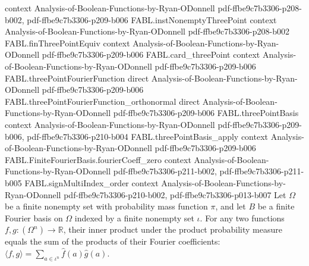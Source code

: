 \begin{theorem}
  {context}
  {Analysis-of-Boolean-Functions-by-Ryan-ODonnell}
  {pdf-ffbe9c7b3306-p208-b002,
    pdf-ffbe9c7b3306-p209-b006}
\proofstep
  {FABL.instNonemptyThreePoint}
  {context}
  {Analysis-of-Boolean-Functions-by-Ryan-ODonnell}
  {pdf-ffbe9c7b3306-p208-b002}
\proofstep
  {FABL.finThreePointEquiv}
  {context}
  {Analysis-of-Boolean-Functions-by-Ryan-ODonnell}
  {pdf-ffbe9c7b3306-p209-b006}
\proofstep
  {FABL.card_threePoint}
  {context}
  {Analysis-of-Boolean-Functions-by-Ryan-ODonnell}
  {pdf-ffbe9c7b3306-p209-b006}
\proofstep
  {FABL.threePointFourierFunction}
  {direct}
  {Analysis-of-Boolean-Functions-by-Ryan-ODonnell}
  {pdf-ffbe9c7b3306-p209-b006}
\proofstep
  {FABL.threePointFourierFunction_orthonormal}
  {direct}
  {Analysis-of-Boolean-Functions-by-Ryan-ODonnell}
  {pdf-ffbe9c7b3306-p209-b006}
\proofstep
  {FABL.threePointBasis}
  {context}
  {Analysis-of-Boolean-Functions-by-Ryan-ODonnell}
  {pdf-ffbe9c7b3306-p209-b006,
    pdf-ffbe9c7b3306-p210-b004}
\proofstep
  {FABL.threePointBasis_apply}
  {context}
  {Analysis-of-Boolean-Functions-by-Ryan-ODonnell}
  {pdf-ffbe9c7b3306-p209-b006}
\proofstep
  {FABL.FiniteFourierBasis.fourierCoeff_zero}
  {context}
  {Analysis-of-Boolean-Functions-by-Ryan-ODonnell}
  {pdf-ffbe9c7b3306-p211-b002,
    pdf-ffbe9c7b3306-p211-b005}
\proofstep
  {FABL.signMultiIndex_order}
  {context}
  {Analysis-of-Boolean-Functions-by-Ryan-ODonnell}
  {pdf-ffbe9c7b3306-p210-b002,
    pdf-ffbe9c7b3306-p013-b007}
Let $\Omega$ be a finite nonempty set with probability mass function $\pi$, and let $B$
be a finite Fourier basis on $\Omega$ indexed by a finite nonempty set $\iota$. For any
two functions $f,g:(\Omega^n)\to\mathbb R$, their inner product under the product
probability measure equals the sum of the products of their Fourier coefficients:
$\langle f,g\rangle=\sum_{a\in\iota^n}\widehat f(a)\widehat g(a)$.
\end{theorem}


